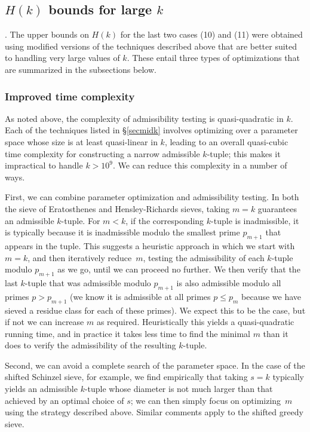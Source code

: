 \subsection{\texorpdfstring{$H(k)$}{H(k)} bounds for large \texorpdfstring{$k$}{k}}.
The upper bounds on $H(k)$ for the last two cases (10) and (11) were obtained using modified versions of the techniques described above that are better suited to handling very large values of $k$.
These entail three types of optimizations that are summarized in the subsections below.

\subsubsection{Improved time complexity}
As noted above, the complexity of admissibility testing is quasi-quadratic in $k$.  Each of the techniques listed in \S\ref{secmidk} involves optimizing over a parameter space whose size is at least quasi-linear in $k$, leading to an overall quasi-cubic time complexity for constructing a narrow admissible $k$-tuple; this makes it impractical to handle $k > 10^9$.
We can reduce this complexity in a number of ways.

First, we can combine parameter optimization and admissibility testing.
In both the sieve of Eratosthenes and Hensley-Richards sieves, taking $m=k$ guarantees an admissible $k$-tuple.
For $m<k$, if the corresponding $k$-tuple is inadmissible, it is typically because it is inadmissible modulo the smallest prime $p_{m+1}$ that appears in the tuple.
This suggests a heuristic approach in which we start with $m=k$, and then iteratively reduce~$m$, testing the admissibility of each $k$-tuple modulo $p_{m+1}$ as we go, until we can proceed no further.
We then verify that the last $k$-tuple that was admissible modulo $p_{m+1}$ is also admissible modulo all primes $p > p_{m+1}$ (we know it is admissible at all primes $p \le p_m$ because we have sieved a residue class for each of these primes).  We expect this to be the case, but if not we can increase $m$ as required.
Heuristically this yields a quasi-quadratic running time, and in practice it takes less time to find the minimal $m$ than it does to verify the admissibility of the resulting $k$-tuple.

Second, we can avoid a complete search of the parameter space.
In the case of the shifted Schinzel sieve, for example, we find empirically that taking $s=k$ typically yields an admissible $k$-tuple whose diameter is not much larger than that achieved by an optimal choice of $s$; we can then simply focus on optimizing~$m$ using the strategy described above.
Similar comments apply to the shifted greedy sieve.

